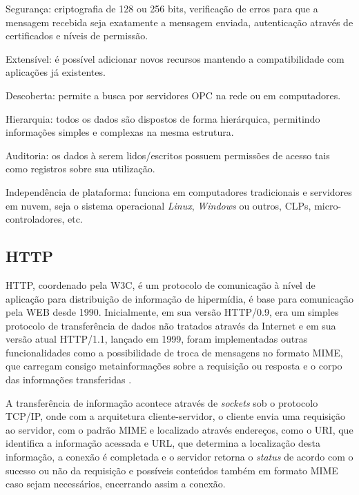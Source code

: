         \begin{alineascomponto}
        	\item Segurança: criptografia de 128 ou 256 bits, verificação de erros para que a mensagem recebida seja exatamente a mensagem enviada, autenticação através de certificados e níveis de permissão.
        	\item Extensível: é possível adicionar novos recursos mantendo a compatibilidade com aplicações já existentes.
        	\item Descoberta: permite a busca por servidores \gls{OPC} na rede ou em computadores.
        	\item Hierarquia: todos os dados são dispostos de forma hierárquica, permitindo informações simples e complexas na mesma estrutura.
        	\item Auditoria: os dados à serem lidos/escritos possuem permissões de acesso tais como registros sobre sua utilização.
        	\item Independência de plataforma: funciona em computadores tradicionais e servidores em nuvem, seja o sistema operacional \textit{Linux}, \textit{Windows} ou outros, \glspl{CLP}, micro-controladores, etc.
        	
        \end{alineascomponto}
	    
    \subsection{HTTP}
    \label{sec:http}
    \gls{HTTP}, coordenado pela \gls{W3C}, é um protocolo de comunicação à nível de aplicação para distribuição de informação de hipermídia, é base para comunicação pela \gls{WEB} desde 1990. Inicialmente, em sua versão HTTP/0.9, era um simples protocolo de transferência de dados não tratados através da Internet e em sua versão atual HTTP/1.1, lançado em 1999, foram implementadas outras funcionalidades como a possibilidade de troca de mensagens no formato \gls{MIME}, que carregam consigo metainformações sobre a requisição ou resposta e o corpo das informações transferidas \cite{HTTP}.
    
    A transferência de informação acontece através de \textit{sockets} sob o protocolo \gls{TCP/IP}, onde com a arquitetura cliente-servidor, o cliente envia uma requisição ao servidor, com o padrão \gls{MIME} e  localizado através endereços, como o \gls{URI}, que identifica a informação acessada e \gls{URL}, que determina a localização desta informação, a conexão é completada e o servidor retorna o \textit{status} de acordo com o sucesso ou não da requisição e possíveis conteúdos também em formato \gls{MIME} caso sejam necessários, encerrando assim a conexão.
    
